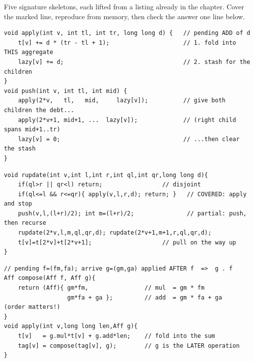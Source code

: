 
Five signature skeletons, each lifted from a listing already in the chapter. Cover
the marked line, reproduce from memory, then check the answer one line below.

\begin{lstlisting}[caption={Drill 1 -- apply + push: fold the tag, then fan it (from lst:c15-apply, lst:c15-push)}]
void apply(int v, int tl, int tr, long long d) {   // pending ADD of d
    t[v] += d * (tr - tl + 1);                     // 1. fold into THIS aggregate
    lazy[v] += d;                                  // 2. stash for the children
}
void push(int v, int tl, int mid) {
    apply(2*v,   tl,   mid,     lazy[v]);          // give both children the debt...
    apply(2*v+1, mid+1, ...  lazy[v]);             // (right child spans mid+1..tr)
    lazy[v] = 0;                                   // ...then clear the stash
}
\end{lstlisting}

\begin{lstlisting}[caption={Drill 2 -- range update / range query: stop on cover, descend only on partial (from lst:c15-rupdate, lst:c15-rquery)}]
void rupdate(int v,int l,int r,int ql,int qr,long long d){
    if(ql>r || qr<l) return;                 // disjoint
    if(ql<=l && r<=qr){ apply(v,l,r,d); return; }   // COVERED: apply and stop
    push(v,l,(l+r)/2); int m=(l+r)/2;               // partial: push, then recurse
    rupdate(2*v,l,m,ql,qr,d); rupdate(2*v+1,m+1,r,ql,qr,d);
    t[v]=t[2*v]+t[2*v+1];                    // pull on the way up
}
\end{lstlisting}

\begin{lstlisting}[caption={Drill 3 -- affine composition: newer on the outside (from lst:c15-affine)}]
// pending f=(fm,fa); arrive g=(gm,ga) applied AFTER f  =>  g . f
Aff compose(Aff f, Aff g){
    return (Aff){ gm*fm,                // mul  = gm * fm
                  gm*fa + ga };         // add  = gm * fa + ga   (order matters!)
}
void apply(int v,long long len,Aff g){
    t[v]   = g.mul*t[v] + g.add*len;    // fold into the sum
    tag[v] = compose(tag[v], g);        // g is the LATER operation
}
\end{lstlisting}

